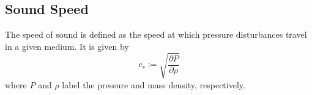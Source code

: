 


    


    \clearpage\subsection{Sound Speed}

        The speed of sound is defined as the speed at which pressure disturbances travel in a 
        given medium. It is given by 
        \begin{equation}
            \label{eq:general_definition_of_sound_speed}
            c_s := \sqrt{\frac{\partial P}{\partial \rho}}
        \end{equation}
        where $P$ and $\rho$ label the pressure and mass density, respectively. \\
        
